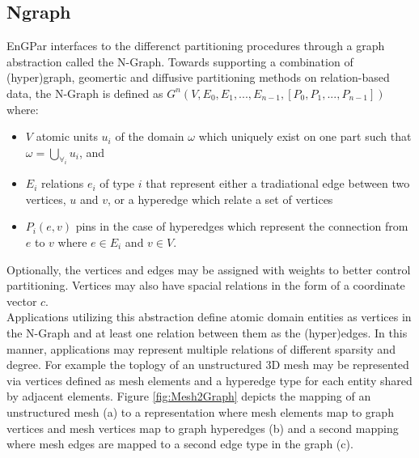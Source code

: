 \documentclass[a4paper]{article}
\begin{document}
\subsection{Ngraph}
EnGPar interfaces to the differenct partitioning procedures through a graph abstraction called the N-Graph. Towards supporting a combination of (hyper)graph, geomertic and diffusive partitioning methods on relation-based data, the N-Graph is defined as $G^n(V,E_0,E_1,...,E_{n-1},[P_0,P_1,...,P_{n-1}])$ where:
\begin{itemize}
  \item $V$ atomic units $u_i$ of the domain $\omega$ which uniquely exist on one
    part such that $\omega = \bigcup_{\forall_i}u_i$, and 
  \item $E_i$ relations $e_i$ of type $i$ that represent either a tradiational edge between two vertices, $u$ and $v$, or a hyperedge which relate a set of vertices
  \item $P_i(e,v)$ pins in the case of hyperedges which represent the connection
    from $e$ to $v$ where $e \in E_i$ and $v \in V$.
\end{itemize}
Optionally, the vertices and edges may be assigned with weights to better control partitioning. Vertices may also have spacial relations in the form of a coordinate vector $c$.\\
Applications utilizing this abstraction define atomic domain entities as vertices in the N-Graph and at least one relation between them as the (hyper)edges. In this manner, applications may represent multiple relations of different sparsity and degree. For example the toplogy of an unstructured 3D mesh may be represented via vertices defined as mesh elements and a hyperedge type for each entity shared by adjacent elements. Figure \ref{fig:Mesh2Graph} depicts the mapping of an unstructured mesh (a) to a representation where mesh elements map to graph vertices and mesh vertices map to graph hyperedges (b) and a second mapping where mesh edges are mapped to a second edge type in the graph (c).
\end{document}
